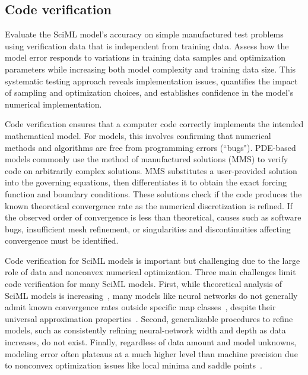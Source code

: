 \subsection{Code verification}
\label{sec:code-verification}

\begin{essrec}
Evaluate the SciML model's accuracy on simple manufactured test problems using verification data that is independent from training data. Assess how the model error responds to variations in training data samples and optimization parameters while increasing both model complexity and training data size. This systematic testing approach reveals implementation issues, quantifies the impact of sampling and optimization choices, and establishes confidence in the model's numerical implementation.
\end{essrec}

Code verification ensures that a computer code correctly implements the intended mathematical model. For \CSE{} models, this involves confirming that numerical methods and algorithms are free from programming errors (``bugs"). PDE-based \CSE{} models commonly use the method of manufactured solutions (MMS) to verify code on arbitrarily complex solutions. MMS substitutes a user-provided solution into the governing equations, then differentiates it to obtain the exact forcing function and boundary conditions. These solutions check if the code produces the known theoretical convergence rate as the numerical discretization is refined. If the observed order of convergence is less than theoretical, causes such as software bugs, insufficient mesh refinement, or singularities and discontinuities affecting convergence must be identified.

Code verification for SciML models is important but challenging due to the large role of data and nonconvex numerical optimization. Three main challenges limit code verification for many SciML models.
First, while theoretical analysis of SciML models is increasing~\cite{schwab2019deep,schwab2023deep,opschoor2022exponential,leshno1993multilayer,lanthaler2023curse,kovachki2021universal,kovachki2023neural}, many models like neural networks do not generally admit known convergence rates outside specific map classes~\cite{schwab2019deep,schwab2023deep,opschoor2022exponential,herrmann2024neural}, despite their universal approximation properties~\cite{hornik1989multilayer,cybenko1989approximation,leshno1993multilayer}.
Second, generalizable procedures to refine models, such as consistently refining neural-network width and depth as data increases, do not exist.
Finally, regardless of data amount and model unknowns, modeling error often plateaus at a much higher level than machine precision due to nonconvex optimization issues like local minima and saddle points~\cite{Dauphin_PGCGB_NIPS_2014,Bottouleon_CN_SIAMR_2018}.

